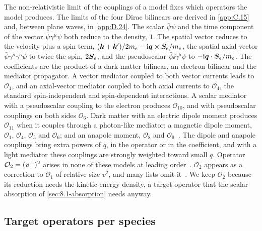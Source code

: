 The non-relativistic limit of the couplings of a model fixes which operators the model produces. The limits of the four Dirac bilinears are derived in \cref{app:C.15} and, between plane waves, in \cref{app:D.24}. The scalar $\bar\psi\psi$ and the time component of the vector $\bar\psi\gamma^\mu\psi$ both reduce to the density, $1$. The spatial vector reduces to the velocity plus a spin term, $(\bm{k} + \bm{k}')/2m_e - \mathrm{i}\bm{q}\times\bm{S}_e/m_e$, the spatial axial vector $\bar\psi\gamma^\mu\gamma^5\psi$ to twice the spin, $2\bm{S}_e$, and the pseudoscalar $\bar\psi\ii\gamma^5\psi$ to $-\mathrm{i}\bm{q}\cdot\bm{S}_e/m_e$. The coefficients are the product of a dark-matter bilinear, an electron bilinear and the mediator propagator. A vector mediator coupled to both vector currents leads to $\mathcal{O}_1$, and an axial-vector mediator coupled to both axial currents to $\mathcal{O}_4$, the standard spin-independent and spin-dependent interactions. A scalar mediator with a pseudoscalar coupling to the electron produces $\mathcal{O}_{10}$, and with pseudoscalar couplings on both sides $\mathcal{O}_6$. Dark matter with an electric dipole moment produces $\mathcal{O}_{11}$ when it couples through a photon-like mediator; a magnetic dipole moment, $\mathcal{O}_1$, $\mathcal{O}_4$, $\mathcal{O}_5$ and $\mathcal{O}_6$; and an anapole moment, $\mathcal{O}_8$ and $\mathcal{O}_9$~\cite[Table~II]{trickle2022effective}. The dipole and anapole couplings bring extra powers of $q$, in the operator or in the coefficient, and with a light mediator these couplings are strongly weighted toward small $q$. Operator $\mathcal{O}_2 = (\bm{v}^\perp)^2$ arises in none of these models at leading order~\cite[Sect.~2.1]{anand2014model}. $\mathcal{O}_2$ appears as a correction to $\mathcal{O}_1$ of relative size $v^2$, and many lists omit it~\cite[Table~I]{catena2021crystal}. We keep $\mathcal{O}_2$ because its reduction needs the kinetic-energy density, a target operator that the scalar absorption of \cref{sec:8.1-absorption} needs anyway.

\subsection{Target operators per species}

